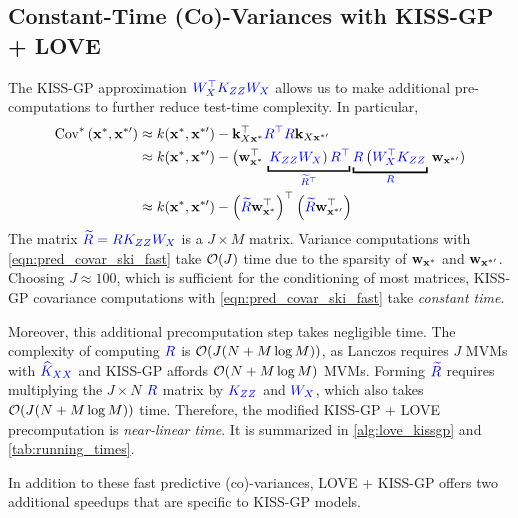 \subsection{Constant-Time (Co)-Variances with KISS-GP + LOVE}
The KISS-GP approximation $\color{blue} W_{X}^\top K_{Z Z} W_{X}$ allows us to make additional pre-computations to further reduce test-time complexity.
In particular,
%
\begin{align}
  \covtest{\bxtest}{\bxtestprime}
  &\approx k(\bxtest, \bxtestprime) - \bk_{\bX \bxtest}^\top {\color{blue} \bR^\top \bR} \bk_{\bX \bxtestprime}
  \nonumber
  \\
  &\approx k(\bxtest, \bxtestprime) - \left( \bw^\top_{\bxtest} \right. \underbracket{\left. {\color{blue} \bK_{\bZ\bZ} \bW_\bX} \right) {\color{blue} \bR^\top}}_{\color{blue} \widetilde \bR^\top}
  \underbracket{{\color{blue} \bR} \left( {\color{blue} \bW_\bX^\top \bK_{\bZ\bZ}} \right.}_{\color{blue} \bR} \left. \bw_{\bxtestprime} \right)
  \nonumber
  \\
  &\approx k(\bxtest, \bxtestprime) -
  \left( {\color{blue} \widetilde \bR} \bw^\top_{\bxtest} \right)^\top
  \left( {\color{blue} \widetilde \bR} \bw^\top_{\bxtestprime} \right)
  \label{eqn:pred_covar_ski_fast}
\end{align}
%
The matrix $\color{blue} \widetilde {R} = R K_{ZZ} W_{X}$ is a $J \times M$ matrix.
Variance computations with \cref{eqn:pred_covar_ski_fast} take $\bigo{J}$ time due to the sparsity of $\mathbf{w}_{\mathbf{x}^*}$ and $\mathbf{w}_{\mathbf{x}^{*\prime}}$.
Choosing $J \approx 100$, which is sufficient for the conditioning of most matrices, KISS-GP covariance computations with \cref{eqn:pred_covar_ski_fast} take \emph{constant time}.

Moreover, this additional precomputation step takes negligible time.
The complexity of computing $\color{blue} R$ is $\bigo{J(N + M \log M)}$, as Lanczos requires $J$ MVMs with $\color{blue} \widehat{K}_{XX}$ and KISS-GP affords $\bigo{N + M \log M}$ MVMs.
Forming $\color{blue} \widetilde {R}$ requires multiplying the $J \! \times \! N$ $\color{blue} R$ matrix by $\color{blue} K_{ZZ}$ and $\color{blue} W_{X}$, which also takes $\bigo{J(N + M \log M)}$ time.
Therefore, the modified KISS-GP + LOVE precomputation is \emph{near-linear time}.
It is summarized in \cref{alg:love_kissgp} and \cref{tab:running_times}.

In addition to these fast predictive (co)-variances, LOVE + KISS-GP offers two additional speedups that are specific to KISS-GP models.




